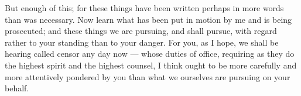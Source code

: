  But enough of this; for these things have been written perhaps in more words than was necessary. Now learn what has been put in motion by me and is being prosecuted; and these things we are pursuing, and shall pursue, with regard rather to your standing than to your danger. For you, as I hope, we shall be hearing called censor any day now --- whose duties of office, requiring as they do the highest spirit and the highest counsel, I think ought to be more carefully and more attentively pondered by you than what we ourselves are pursuing on your behalf.
